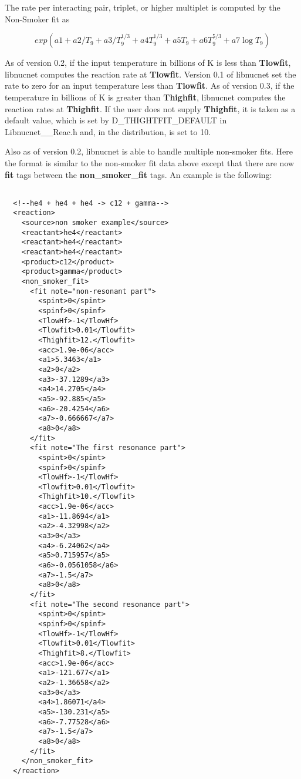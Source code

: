 \documentclass{article}    %
\begin{document}
The rate per interacting pair, triplet, or higher multiplet is
computed by the Non-Smoker fit as

\begin{equation}
exp\left( a1 + a2/T_9 + a3 / T_9^{1/3} + a4 T_9^{1/3} + a5 T_9 + a6
T_9^{5/3} + a7 \log T_9  \right ) \label{eq:nonSmokerFit}
\end{equation}

As of version 0.2, if the input temperature in billions of K is less than {\bf
Tlowfit}, libnucnet computes the reaction rate at {\bf Tlowfit}.  Version
0.1 of libnucnet set the rate to zero for an input temperature less than
{\bf Tlowfit}.  As of version 0.3, if the temperature in billions of K is
greater than {\bf Thighfit}, libnucnet computes the reaction rates at
{\bf Thighfit}.  If the user does not supply {\bf Thighfit}, it is taken as a
default value, which is set by D\_THIGHTFIT\_DEFAULT in Libnucnet\_\_Reac.h
and, in the distribution, is set to 10.

Also as of version 0.2, libnucnet is able to handle multiple non-smoker fits.
Here the format is similar to the non-smoker fit data above except that
there are now {\bf fit} tags between the {\bf non\_smoker\_fit} tags.
An example is the following:

\begin{verbatim}

  <!--he4 + he4 + he4 -> c12 + gamma-->
  <reaction>
    <source>non smoker example</source>
    <reactant>he4</reactant>
    <reactant>he4</reactant>
    <reactant>he4</reactant>
    <product>c12</product>
    <product>gamma</product>
    <non_smoker_fit>
      <fit note="non-resonant part">
        <spint>0</spint>
        <spinf>0</spinf>
        <TlowHf>-1</TlowHf>
        <Tlowfit>0.01</Tlowfit>
        <Thighfit>12.</Tlowfit>
        <acc>1.9e-06</acc>
        <a1>5.3463</a1>
        <a2>0</a2>
        <a3>-37.1289</a3>
        <a4>14.2705</a4>
        <a5>-92.885</a5>
        <a6>-20.4254</a6>
        <a7>-0.666667</a7>
        <a8>0</a8>
      </fit>
      <fit note="The first resonance part">
        <spint>0</spint>
        <spinf>0</spinf>
        <TlowHf>-1</TlowHf>
        <Tlowfit>0.01</Tlowfit>
        <Thighfit>10.</Tlowfit>
        <acc>1.9e-06</acc>
        <a1>-11.8694</a1>
        <a2>-4.32998</a2>
        <a3>0</a3>
        <a4>-6.24062</a4>
        <a5>0.715957</a5>
        <a6>-0.0561058</a6>
        <a7>-1.5</a7>
        <a8>0</a8>
      </fit>
      <fit note="The second resonance part">
        <spint>0</spint>
        <spinf>0</spinf>
        <TlowHf>-1</TlowHf>
        <Tlowfit>0.01</Tlowfit>
        <Thighfit>8.</Tlowfit>
        <acc>1.9e-06</acc>
        <a1>-121.677</a1>
        <a2>-1.36658</a2>
        <a3>0</a3>
        <a4>1.86071</a4>
        <a5>-130.231</a5>
        <a6>-7.77528</a6>
        <a7>-1.5</a7>
        <a8>0</a8>
      </fit>
    </non_smoker_fit>
  </reaction>

\end{verbatim}
\end{document}
